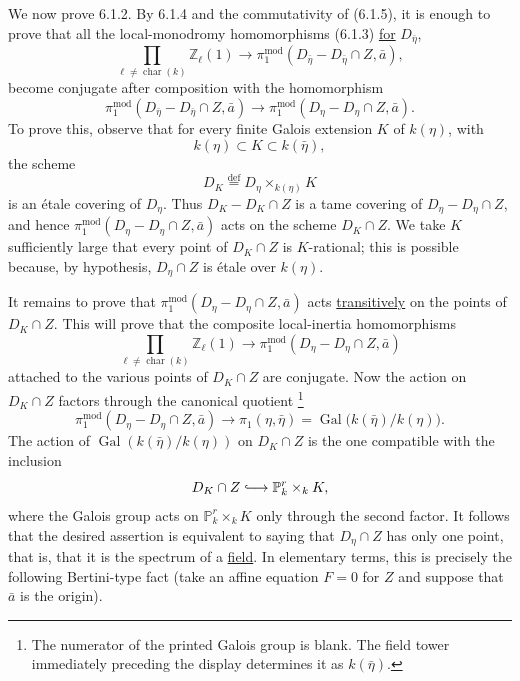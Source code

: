 We now prove 6.1.2.  By 6.1.4 and the commutativity of (6.1.5), it is
enough to prove that all the local-monodromy homomorphisms (6.1.3)
\underline{for} $D_{\bar\eta}$,
\begin{equation}\tag{6.1.7.1}
\prod_{\ell\ne\operatorname{char}(k)}\mathbb Z_\ell(1)
\longrightarrow
\pi_1^{\mathrm{mod}}(D_{\bar\eta}-D_{\bar\eta}\cap Z,\bar a),
\end{equation}
become conjugate after composition with the homomorphism
\begin{equation}\tag{6.1.7.2}
\pi_1^{\mathrm{mod}}(D_{\bar\eta}-D_{\bar\eta}\cap Z,\bar a)
\longrightarrow
\pi_1^{\mathrm{mod}}(D_\eta-D_\eta\cap Z,\bar a).
\end{equation}
To prove this, observe that for every finite Galois extension $K$ of
$k(\eta)$, with
\[
k(\eta)\subset K\subset k(\bar\eta),
\]
the scheme
\[
D_K\stackrel{\mathrm{def}}{=}D_\eta\times_{k(\eta)}K
\]
is an étale covering of $D_\eta$.  Thus
$D_K-D_K\cap Z$ is a tame covering of $D_\eta-D_\eta\cap Z$, and hence
$\pi_1^{\mathrm{mod}}(D_\eta-D_\eta\cap Z,\bar a)$ acts on the scheme
$D_K\cap Z$.  We take $K$ sufficiently large that every point of
$D_K\cap Z$ is $K$-rational; this is possible because, by hypothesis,
$D_\eta\cap Z$ is étale over $k(\eta)$.

It remains to prove that
$\pi_1^{\mathrm{mod}}(D_\eta-D_\eta\cap Z,\bar a)$ acts
\underline{transitively} on the points of $D_K\cap Z$.  This will prove
that the composite local-inertia homomorphisms
\[
\prod_{\ell\ne\operatorname{char}(k)}\mathbb Z_\ell(1)
\longrightarrow
\pi_1^{\mathrm{mod}}(D_\eta-D_\eta\cap Z,\bar a)
\]
attached to the various points of $D_K\cap Z$ are conjugate.  Now the
action on $D_K\cap Z$ factors through the canonical quotient
\footnote{The numerator of the printed Galois group is blank.  The field
tower immediately preceding the display determines it as $k(\bar\eta)$.}
\[
\pi_1^{\mathrm{mod}}(D_\eta-D_\eta\cap Z,\bar a)
\longrightarrow
\pi_1(\eta,\bar\eta)
=\operatorname{Gal}\bigl(k(\bar\eta)/k(\eta)\bigr).
\]
The action of $\operatorname{Gal}(k(\bar\eta)/k(\eta))$ on
$D_K\cap Z$ is the one compatible with the inclusion
\[
D_K\cap Z\lhook\joinrel\longrightarrow\mathbb P^r_k\times_k K,
\]
where the Galois group acts on $\mathbb P^r_k\times_k K$ only through
the second factor.  It follows that the desired assertion is equivalent
to saying that $D_\eta\cap Z$ has only one point, that is, that it is the
spectrum of a \underline{field}.  In elementary terms, this is precisely
the following Bertini-type fact (take an affine equation $F=0$ for $Z$
and suppose that $\bar a$ is the origin).

